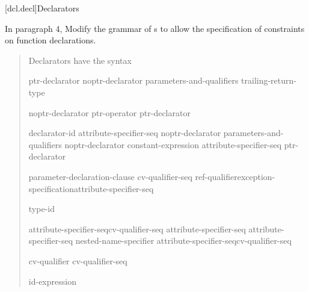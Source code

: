
[dcl.decl]{Declarators}

In paragraph 4, Modify the grammar of s to
allow the specification of constraints on function declarations.

\begin{quote}
\setcounter{Paras}{3}
\pnum
Declarators have the syntax

\begin{bnf}
\br
    ptr-declarator\br
    noptr-declarator parameters-and-qualifiers trailing-return-type
\end{bnf}

\begin{bnf}
\br
    noptr-declarator\br
    ptr-operator ptr-declarator
\end{bnf}

\begin{bnf}
\br
    declarator-id attribute-specifier-seq\opt\br
    noptr-declarator parameters-and-qualifiers\br
    noptr-declarator \terminal{[} constant-expression\opt{} \terminal{]} attribute-specifier-seq\opt\br
    \terminal{(} ptr-declarator \terminal{)}
\end{bnf}

\begin{bnf}
\br
  \terminal{(} parameter-declaration-clause \terminal{)} cv-qualifier-seq\opt\br
    \hspace*{\bnfindentinc}ref-qualifier\opt exception-specification\opt attribute-specifier-seq\opt {}\opt
\end{bnf}

\begin{bnf}
\br
    \terminal{->} type-id
\end{bnf}

\begin{bnf}
\br
    \terminal{*} attribute-specifier-seq\opt cv-qualifier-seq\opt\br
    \terminal{\&} attribute-specifier-seq\opt\br
    \terminal{\&\&} attribute-specifier-seq\opt\br
    nested-name-specifier \terminal{*} attribute-specifier-seq\opt cv-qualifier-seq\opt
\end{bnf}

\begin{bnf}
\br
    cv-qualifier cv-qualifier-seq\opt
\end{bnf}

\begin{bnf}
\br
    \br
\end{bnf}

\begin{bnf}
\br
    \terminal{\&}\br
    \terminal{\&\&}
\end{bnf}

\begin{bnf}
\br
    \opt id-expression
\end{bnf}
\end{quote}

